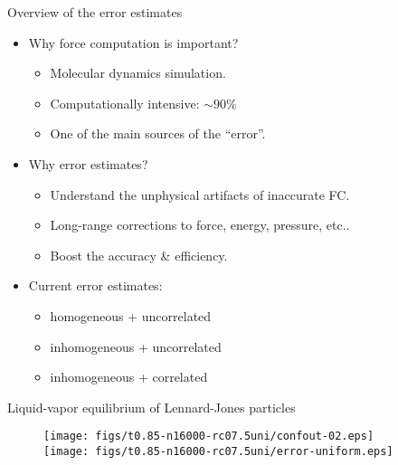 \documentclass{beamer}
\newcommand{\redc}[1]{{\color{red} #1}}
\newcommand{\bluec}[1]{{\color{blue} #1}}
\newcommand{\tickYes}{\checkmark}
\begin{document}
\begin{frame}{Overview of the error estimates}
  \begin{itemize}
    \vfill
  \item <1-> Why force computation is important?
    \begin{itemize}\itemsep 3pt
    \item Molecular dynamics simulation.
    \item Computationally intensive: \redc{$ \sim 90 \%$}
    \item One of the main sources of the \redc{``error''}.
    \end{itemize}
    \vfill
  \item<2-> Why error estimates?
    \begin{itemize}\itemsep 3pt
    \item Understand the unphysical artifacts of inaccurate FC.
    \item Long-range corrections to \redc{force, energy, pressure, etc.}.
    \item Boost the \redc{accuracy \& efficiency}.
    \end{itemize}
    \vfill
  \item<3->   Current error estimates:
    \begin{itemize}\itemsep 3pt
    \item <3-> homogeneous  + uncorrelated \quad \bluec{\tickYes\:$\mathcal O(1)$}
    \item <4-> inhomogeneous  + uncorrelated \quad \redc{\tickYes\:$\mathcal O(N\log N)$}
    \item <4-> inhomogeneous  + correlated \quad \redc{\tickYes\:$\mathcal O(N^2\log N) \rightarrow \mathcal O(N\log N)$}
    \end{itemize}
    \vfill
  \end{itemize}
\end{frame}


\begin{frame}{Liquid-vapor equilibrium of Lennard-Jones particles}
  \begin{figure}
    \centering
    \texttt{[image: figs/t0.85-n16000-rc07.5uni/confout-02.eps]}\\
    \texttt{[image: figs/t0.85-n16000-rc07.5uni/error-uniform.eps]}
  \end{figure}
\end{frame}
\end{document}
